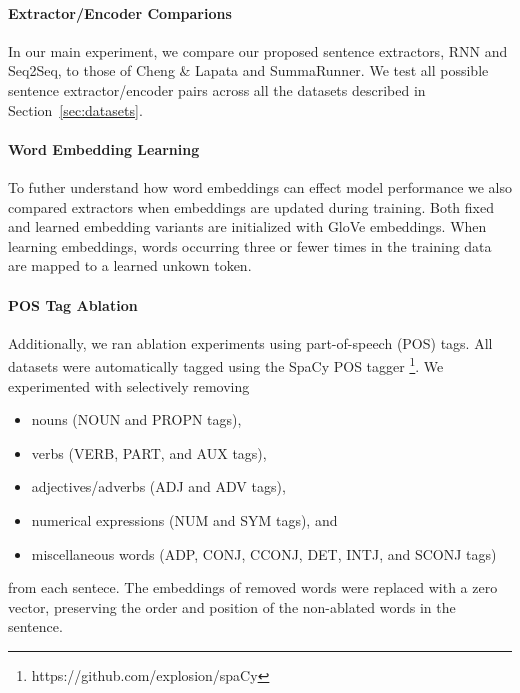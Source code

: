 



\paragraph{Extractor/Encoder Comparions}{
In our main experiment, we compare our proposed 
sentence extractors, RNN and Seq2Seq,
to those of Cheng \& Lapata and SummaRunner.
We test all possible sentence extractor/encoder pairs across all the datasets
described in Section~\ref{sec:datasets}.} 


\paragraph{Word Embedding Learning}{To futher understand how word 
embeddings 
can
effect model performance we also compared extractors when embeddings 
are updated during training. Both fixed and learned embedding variants are 
initialized with GloVe embeddings. When learning embeddings, words occurring 
three or fewer times in the training data are mapped to a learned unkown
token.}

\paragraph{POS Tag Ablation}{Additionally, we ran ablation experiments
using part-of-speech (POS) tags. 
All datasets were automatically tagged using
the SpaCy POS tagger \footnote{https://github.com/explosion/spaCy}.   
We experimented with selectively removing 
\begin{itemize}
    \item nouns (NOUN and PROPN tags), 
    \item verbs (VERB, PART, and AUX tags), 
    \item adjectives/adverbs (ADJ and ADV tags), 
    \item numerical expressions (NUM and SYM tags), and 
    \item miscellaneous words (ADP, CONJ, CCONJ, DET, INTJ, and SCONJ tags)
\end{itemize}
from each sentece. 
The embeddings of removed words were replaced with a zero vector,
preserving the order and position of the non-ablated words in the sentence.
}

